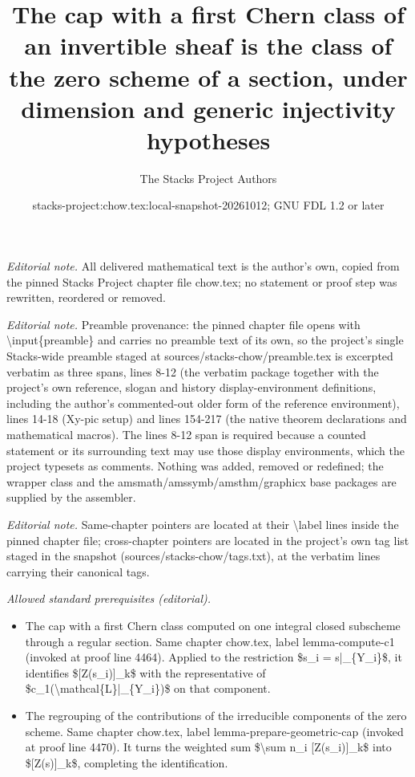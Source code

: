 \documentclass[10pt,a4paper]{amsart}
\title{The cap with a first Chern class of an invertible sheaf is the class of the zero scheme of a section, under dimension and generic injectivity hypotheses}
\author{The Stacks Project Authors}
\date{stacks-project:chow.tex:local-snapshot-20261012; GNU FDL 1.2 or later}
\theoremstyle{plain}
\theoremstyle{definition}
\theoremstyle{remark}
\numberwithin{equation}{subsection}
\begin{document}
\maketitle
\noindent\textit{Editorial note.} All delivered mathematical text is the author's own, copied from the pinned Stacks Project chapter file chow.tex; no statement or proof step was rewritten, reordered or removed.\par\medskip
\noindent\textit{Editorial note.} Preamble provenance: the pinned chapter file opens with \textbackslash{}input\{preamble\} and carries no preamble text of its own, so the project's single Stacks-wide preamble staged at sources/stacks-chow/preamble.tex is excerpted verbatim as three spans, lines 8-12 (the verbatim package together with the project's own reference, slogan and history display-environment definitions, including the author's commented-out older form of the reference environment), lines 14-18 (Xy-pic setup) and lines 154-217 (the native theorem declarations and mathematical macros). The lines 8-12 span is required because a counted statement or its surrounding text may use those display environments, which the project typesets as comments. Nothing was added, removed or redefined; the wrapper class and the amsmath/amssymb/amsthm/graphicx base packages are supplied by the assembler.\par\medskip
\noindent\textit{Editorial note.} Same-chapter pointers are located at their \textbackslash{}label lines inside the pinned chapter file; cross-chapter pointers are located in the project's own tag list staged in the snapshot (sources/stacks-chow/tags.txt), at the verbatim lines carrying their canonical tags.\par\medskip
\noindent\textit{Allowed standard prerequisites (editorial).}\begin{itemize}
\item The cap with a first Chern class computed on one integral closed subscheme through a regular section. Same chapter chow.tex, label lemma-compute-c1 (invoked at proof line 4464). Applied to the restriction \$s\_i = s|\_\{Y\_i\}\$, it identifies \$[Z(s\_i)]\_k\$ with the representative of \$c\_1(\textbackslash{}mathcal\{L\}|\_\{Y\_i\})\$ on that component.
\item The regrouping of the contributions of the irreducible components of the zero scheme. Same chapter chow.tex, label lemma-prepare-geometric-cap (invoked at proof line 4470). It turns the weighted sum \$\textbackslash{}sum n\_i [Z(s\_i)]\_k\$ into \$[Z(s)]\_k\$, completing the identification.
\end{itemize}\medskip
\end{document}
